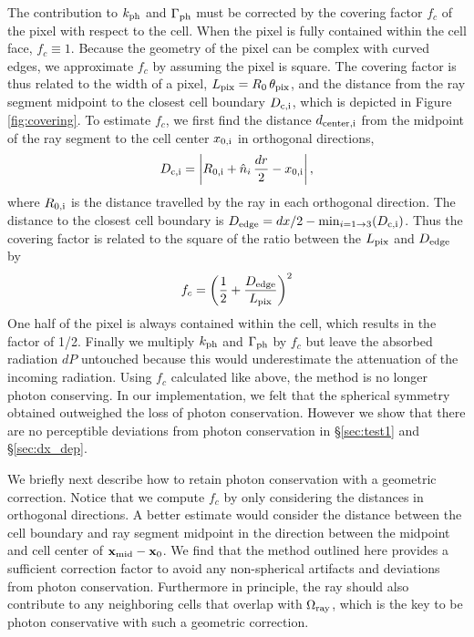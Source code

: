 \documentclass[useAMS,usenatbib]{mn2e}
\begin{document}
The contribution to $k_{\rm ph}$ and $\Gamma_{\rm ph}$ must be
corrected by the covering factor $f_c$ of the pixel with respect to
the cell.  When the pixel is fully contained within the cell face,
$f_c \equiv 1$.  Because the geometry of the pixel can be complex with
curved edges, we approximate $f_c$ by assuming the pixel is square.
The covering factor is thus related to the width of a pixel, $L_{\rm
  pix} = R_0 \, \theta_{\rm pix}$, and the distance from the ray
segment midpoint to the closest cell boundary $D_{\rm c,i}$, which is
depicted in Figure \ref{fig:covering}.  To estimate $f_c$, we first
find the distance $d_{\rm center,i}$ from the midpoint of the ray
segment to the cell center $x_{\rm 0,i}$ in orthogonal directions,
%
\begin{equation}
  \label{eqn:midpoint}
  D_{\rm c,i} = \left| R_{\rm 0,i} + \hat{n}_i\,\frac{dr}{2} - x_{\rm
      0,i} \right|,
\end{equation}
where $R_{\rm 0,i}$ is the distance travelled by the ray in each
orthogonal direction.  The distance to the closest cell boundary is
$D_{\rm edge} = dx/2 - \min_{i=1 \rightarrow 3} (D_{\rm c,i})$.  Thus
the covering factor is related to the square of the ratio between the
$L_{\rm pix}$ and $D_{\rm edge}$ by
%
\begin{equation}
  \label{eqn:fc}
  f_c = \left( \frac{1}{2} + \frac{D_{\rm edge}}{L_{\rm pix}} \right)^2
\end{equation}
One half of the pixel is always contained within the cell, which
results in the factor of 1/2.  Finally we multiply $k_{\rm ph}$ and
$\Gamma_{\rm ph}$ by $f_c$ but leave the absorbed radiation $dP$
untouched because this would underestimate the attenuation of the
incoming radiation.  Using $f_c$ calculated like above, the method is
no longer photon conserving.  In our implementation, we felt that the
spherical symmetry obtained outweighed the loss of photon
conservation.  However we show that there are no perceptible
deviations from photon conservation in \S\ref{sec:test1} and
\S\ref{sec:dx_dep}.

We briefly next describe how to retain photon conservation with a
geometric correction.  Notice that we compute $f_c$ by only
considering the distances in orthogonal directions.  A better estimate
would consider the distance between the cell boundary and ray segment
midpoint in the direction between the midpoint and cell center of
$\mathbf{x}_{\rm mid} - \mathbf{x}_0$.  We find that the method
outlined here provides a sufficient correction factor to avoid any
non-spherical artifacts and deviations from photon conservation.
Furthermore in principle, the ray should also contribute to any
neighboring cells that overlap with $\Omega_{\rm ray}$, which is the
key to be photon conservative with such a geometric correction.
\end{document}
